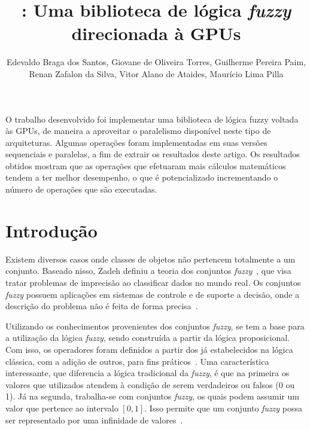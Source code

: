 \documentclass[12pt]{article}
\title{\libname: Uma biblioteca de lógica \textit{fuzzy} direcionada à GPUs}
\author{Edevaldo Braga dos Santos\inst{1}, Giovane de Oliveira Torres\inst{1}, Guilherme Pereira Paim\inst{1},\\ Renan Zafalon da Silva\inst{1}, Vitor Alano de Ataides\inst{1}, Maurício Lima Pilla\inst{1}}
\begin{document}
\newcommand{\libname}{CudaFuzzy}

\maketitle




\begin{resumo}

O trabalho desenvolvido foi implementar uma biblioteca de lógica fuzzy voltada às GPUs, de maneira a aproveitar o paralelismo disponível neste tipo de arquiteturas. Algumas operações foram implementadas em suas versões sequenciais e paralelas, a fim de extrair os resultados deste artigo. Os resultados obtidos mostram que as operações que efetuaram mais cálculos matemáticos tendem a ter melhor desempenho, o que é potencializado incrementando o número de operações que são executadas.

\end{resumo}

\section{Introdução}
\label{sec:introducao}


	Existem diversos casos onde classes de objetos não pertencem totalmente a um conjunto. Baseado nisso, Zadeh definiu a teoria dos conjuntos \textit{fuzzy}~\cite{zadeh:65}, que visa tratar problemas de imprecisão ao classificar dados no mundo real. Os conjuntos \textit{fuzzy} possuem aplicações em sistemas de controle e de suporte a decisão, onde a descrição do problema não é feita de forma precisa~\cite{weber:03}.
	
	Utilizando os conhecimentos provenientes dos conjuntos \textit{fuzzy}, se tem a base para a utilização da lógica \textit{fuzzy}, sendo construída a partir da lógica proposicional. Com isso, os operadores foram definidos a partir dos já estabelecidos na lógica clássica, com a adição de outros, para fins práticos~\cite{tanscheit:04}. Uma característica interessante, que diferencia a lógica tradicional da \textit{fuzzy}, é que na primeira os valores que utilizados atendem à condição de serem verdadeiros ou falsos (0 ou 1). Já na segunda, trabalha-se com conjuntos \textit{fuzzy}, os quais podem assumir um valor que pertence ao intervalo $[0, 1]$. Isso permite que um conjunto \textit{fuzzy} possa ser representado por uma infinidade de valores~\cite{klir:95}.	
	
\end{document}
